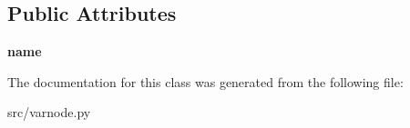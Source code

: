 \subsection*{Public Attributes}
\begin{DoxyCompactItemize}
\item 
\mbox{\label{classsrc_1_1varnode_1_1VarNode_a1b645d6a685c2340eed9d37594f96de2}} 
{\bfseries name}
\end{DoxyCompactItemize}


The documentation for this class was generated from the following file\+:\begin{DoxyCompactItemize}
\item 
src/varnode.\+py\end{DoxyCompactItemize}
